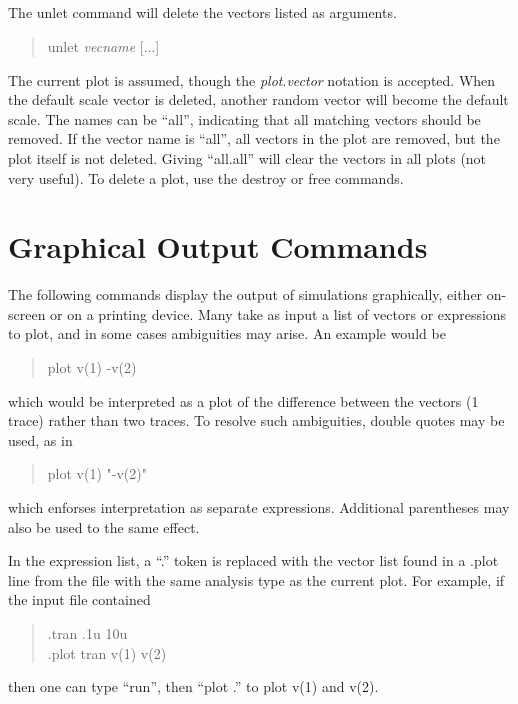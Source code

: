 \subsection{}


The {\cb unlet} command will delete the vectors listed as arguments. 
\begin{quote}\vt
unlet {\it vecname} [...]
\end{quote}
The current plot is assumed, though the {\it plot\/}.{\it vector}
notation is accepted.  When the default scale vector is deleted,
another random vector will become the default scale.  The names can be
``{\vt all}'', indicating that all matching vectors should be removed. 
If the vector name is ``{\vt all}'', all vectors in the plot are
removed, but the plot itself is not deleted.  Giving ``{\vt all.all}''
will clear the vectors in all plots (not very useful).  To delete a
plot, use the {\cb destroy} or {\cb free} commands.


\section{Graphical Output Commands}
\label{grout}


The following commands display the output of simulations graphically,
either on-screen or on a printing device.  Many take as input a list of
vectors or expressions to plot, and in some cases ambiguities may arise.
An example would be
\begin{quote}
{\vt plot v(1) -v(2)}
\end{quote}
which would be interpreted as a plot of the difference between the 
vectors (1 trace) rather than two traces.  To resolve such ambiguities, 
double quotes may be used, as in 
\begin{quote}
{\vt plot v(1) "-v(2)"}
\end{quote}
which enforses interpretation as separate expressions.  Additional
parentheses may also be used to the same effect.

In the expression list, a ``.'' token is replaced with the vector list
found in a {\vt .plot} line from the file with the same analysis type
as the current plot.  For example, if the input file contained
\begin{quote}\vt
   .tran .1u 10u\\
   .plot tran v(1) v(2)\\
\end{quote}
then one can type ``{\vt run}'', then ``{\vt plot .}'' to plot {\vt
v(1)} and {\vt v(2)}.

